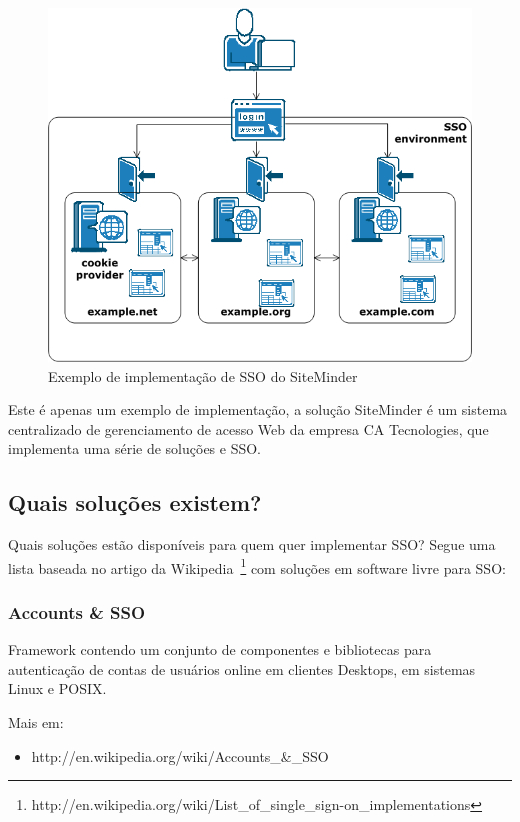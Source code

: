 \documentclass[11pt]{article}
\begin{document}
\begin{figure}[h]
\center
\includegraphics[scale=0.6]{sso-siteminder.png}
\caption{Exemplo de implementação de SSO do SiteMinder}
\label{fig:sso-siteminder}
\end{figure}

Este é apenas um exemplo de implementação, a solução SiteMinder é um sistema
centralizado de gerenciamento de acesso Web da empresa CA Tecnologies, que
implementa uma série de soluções e SSO.

\subsection{Quais soluções existem?}

Quais soluções estão disponíveis para quem quer implementar SSO? Segue
uma lista baseada no artigo da
Wikipedia~\footnote{http://en.wikipedia.org/wiki/List\_of\_single\_sign-on\_implementations}
com soluções em software livre para SSO:

\subsubsection{Accounts \& SSO}

Framework contendo um conjunto de componentes e bibliotecas para autenticação
de contas de usuários online em clientes Desktops, em sistemas Linux e POSIX.

Mais em:
\begin{itemize}
  \item{http://en.wikipedia.org/wiki/Accounts\_\&\_SSO}
\end{itemize}
\end{document}
